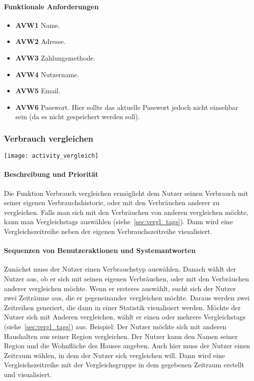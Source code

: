 \paragraph{Funktionale Anforderungen}
\begin{itemize}
	\item \textbf{AVW1} Name.
	\item \textbf{AVW2} Adresse.
	\item \textbf{AVW3} Zahlungsmethode.
	\item \textbf{AVW4} Nutzername.
	\item \textbf{AVW5} Email.
	\item \textbf{AVW6} Passwort.
	      Hier sollte das aktuelle Passwort jedoch nicht einsehbar sein
	      (da es nicht gespeichert werden soll).
\end{itemize}




\subsubsection{Verbrauch vergleichen}
\texttt{[image: activity\_vergleich]}
\paragraph{Beschreibung und Priorität}
Die Funktion Verbrauch vergleichen ermöglicht dem Nutzer seinen Verbrauch mit seiner eigenen Verbrauchshistorie,
oder mit den Verbräuchen anderer zu vergleichen.
Falls man sich mit den Verbräuchen von anderen vergleichen möchte, kann man Vergleichstags auswählen
(siehe~\ref{sec:vergl_tags}).
Dann wird eine Vergleichszeitreihe neben der eigenen Verbrauchszeitreihe visualisiert.
\paragraph{Sequenzen von Benutzeraktionen und Systemantworten}
Zunächst muss der Nutzer einen Verbrauchstyp auswählen.
Danach wählt der Nutzer aus, ob er sich mit seinen eigenen Verbräuchen, oder mit den Verbräuchen anderer vergleichen möchte.
Wenn er ersteres auswählt, sucht sich der Nutzer zwei Zeiträume aus, die er gegeneinander vergleichen möchte.
Daraus werden zwei Zeitreihen generiert, die dann in einer Statistik visualisiert werden.
Möchte der Nutzer sich mit Anderen vergleichen, wählt er einen oder mehrere Vergleichstags (siehe~\ref{sec:vergl_tags}) aus.
Beispiel: Der Nutzer möchte sich mit anderen Haushalten aus seiner Region vergleichen.
Der Nutzer kann den Namen seiner Region und die Wohnfläche des Hauses angeben.
Auch hier muss der Nutzer einen Zeitraum wählen, in dem der Nutzer sich vergleichen will.
Dann wird eine Vergleichszeitreihe mit der Vergleichsgruppe in dem gegebenen Zeitraum erstellt und visualisiert.
